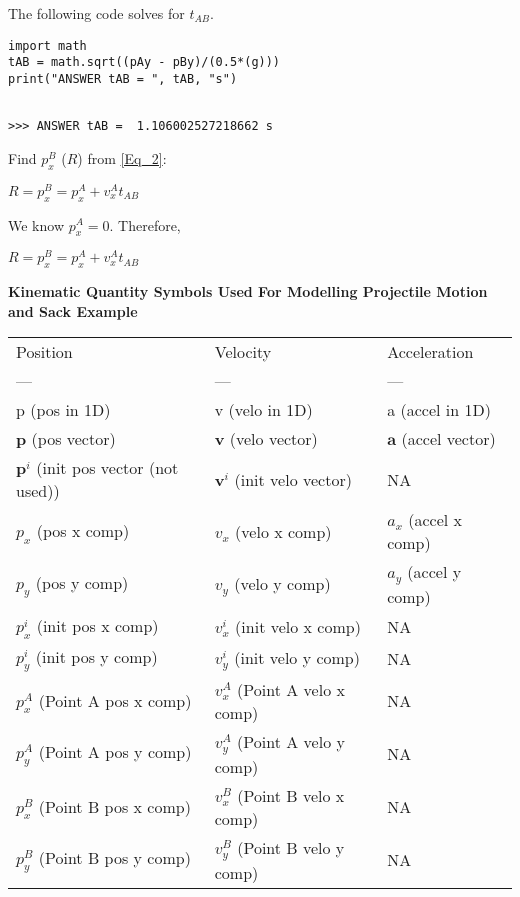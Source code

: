 \documentclass[11pt]{article}
\begin{document}
The following code solves for $t_{AB}$.

\begin{verbatim}
import math
tAB = math.sqrt((pAy - pBy)/(0.5*(g)))
print("ANSWER tAB = ", tAB, "s")
\end{verbatim}

\begin{verbatim}

>>> ANSWER tAB =  1.106002527218662 s
\end{verbatim}

Find $p_x^B$ ($R$) from \ref{Eq_2}:

$R = p^B_x = p^A_x + v^A_x t_{AB}$

We know $p^A_x = 0$.  Therefore,

$R = p^B_x = p^A_x + v^A_x t_{AB}$



\textbf{Kinematic Quantity Symbols Used For Modelling Projectile Motion and Sack Example}

\begin{center}
\begin{tabular}{lll}
Position & Velocity & Acceleration\\
--- & --- & ---\\
p (pos in 1D) & v (velo in 1D) & a (accel in 1D)\\
$\mathbf{p}$ (pos vector) & $\mathbf{v}$ (velo vector) & $\mathbf{a}$ (accel vector)\\
$\mathbf{p}^i$ (init pos vector (not used)) & $\mathbf{v}^i$ (init velo vector) & NA\\
$p_x$ (pos x comp) & $v_x$ (velo x comp) & $a_x$ (accel x comp)\\
$p_y$ (pos y comp) & $v_y$ (velo y comp) & $a_y$ (accel y comp)\\
$p_x^i$ (init pos x comp) & $v_x^i$ (init velo x comp) & NA\\
$p_y^i$ (init pos y comp) & $v_y^i$ (init velo y comp) & NA\\
$p_x^A$ (Point A pos x comp) & $v_x^A$ (Point A velo x comp) & NA\\
$p_y^A$ (Point A pos y comp) & $v_y^A$ (Point A velo y comp) & NA\\
$p_x^B$ (Point B pos x comp) & $v_x^B$ (Point B velo x comp) & NA\\
$p_y^B$ (Point B pos y comp) & $v_y^B$ (Point B velo y comp) & NA\\
\end{tabular}
\end{center}
\end{document}
